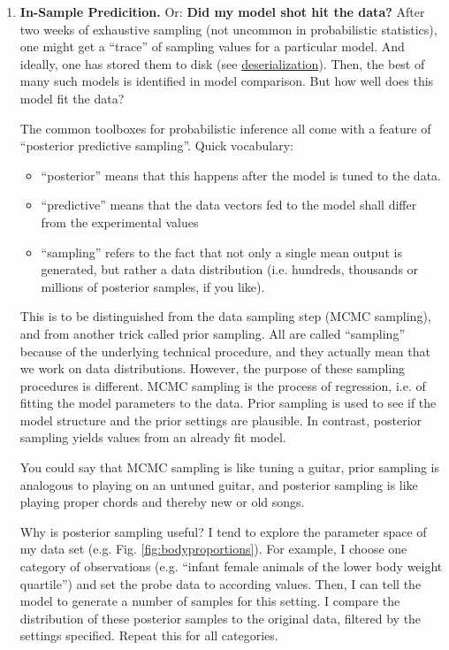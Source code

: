 \begin{enumerate}
\item \textbf{In-Sample Predicition.}
\label{sec:org369b808}
Or: \textbf{Did my model shot hit the data?}
After two weeks of exhaustive sampling (not uncommon in probabilistic statistics), one might get a ``trace'' of sampling values for a particular model.
And ideally, one has stored them to disk (see \hyperref[workflow:deserialization]{deserialization}).
Then, the best of many such models is identified in model comparison.
But how well does this model fit the data?

The common toolboxes for probabilistic inference all come with a feature of ``posterior predictive sampling''.
Quick vocabulary:
\begin{itemize}
\item ``posterior'' means that this happens after the model is tuned to the data.
\item ``predictive'' means that the data vectors fed to the model shall differ from the experimental values
\item ``sampling'' refers to the fact that not only a single mean output is generated, but rather a data distribution (i.e. hundreds, thousands or millions of posterior samples, if you like).
\end{itemize}

This is to be distinguished from the data sampling step (MCMC sampling), and from another trick called prior sampling.
All are called ``sampling'' because of the underlying technical procedure, and they actually mean that we work on data distributions.
However, the purpose of these sampling procedures is different.
MCMC sampling is the process of regression, i.e. of fitting the model parameters to the data.
Prior sampling is used to see if the model structure and the prior settings are plausible.
In contrast, posterior sampling yields values from an already fit model.

You could say that MCMC sampling is like tuning a guitar, prior sampling is analogous to playing on an untuned guitar, and posterior sampling is like playing proper chords and thereby new or old songs.


Why is posterior sampling useful?
I tend to explore the parameter space of my data set (e.g. Fig. \ref{fig:bodyproportions}).
For example, I choose one category of observations (e.g. ``infant female animals of the lower body weight quartile'') and set the probe data to according values.
Then, I can tell the model to generate a number of samples for this setting.
I compare the distribution of these posterior samples to the original data, filtered by the settings specified.
Repeat this for all categories.


\end{enumerate}
